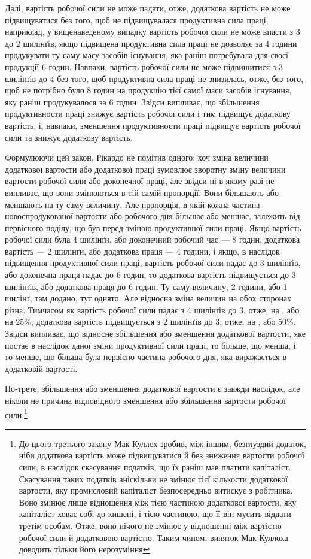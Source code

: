 Далі, вартість робочої сили не може падати, отже, додаткова
вартість не може підвищуватися без того, щоб не підвищувалася
продуктивна сила праці; наприклад, у вищенаведеному випадку
вартість робочої сили не може впасти з 3 до 2 шилінґів, якщо
підвищена продуктивна сила праці не дозволяє за 4 години продукувати
ту саму масу засобів існування, яка раніш потребувала
для своєї продукції 6 годин. Навпаки, вартість робочої сили не
може підвищитися з 3 шилінґів до 4 без того, щоб продуктивна
сила праці не знизилась, отже, без того, щоб не потрібно було
8 годин на продукцію тієї самої маси засобів існування, яку раніш
продукувалося за 6 годин. Звідси випливає, що збільшення продуктивности
праці знижує вартість робочої сили і тим підвищує
додаткову вартість, і, навпаки, зменшення продуктивности праці
підвищує вартість робочої сили та знижує додаткову вартість.

Формулюючи цей закон, Рікардо не помітив одного: хоч зміна
величини додаткової вартости або додаткової праці зумовлює
зворотну зміну величини вартости робочої сили або доконечної
праці, але звідси ні в якому разі не випливає, що вони змінюються
в тій самій пропорції. Вони більшають або меншають на ту саму
величину. Але пропорція, в якій кожна частина новоспродукованої
вартости або робочого дня більшає або меншає, залежить
від первісного поділу, що був перед зміною продуктивної сили
праці. Якщо вартість робочої сили була 4 шилінґи, або доконечний
робочий час — 8 годин, додаткова вартість — 2 шилінґи,
або додаткова праця — 4 години, і якщо, в наслідок підвищення
продуктивної сили праці, вартість робочої сили падає
до 3 шилінґів, або доконечна праця падає до 6 годин, то додаткова
вартість підвищується до 3 шилінґів, або додаткова праця
до 6 годин. Ту саму величину, 2 години, або 1 шилінґ, там додано,
тут однято. Але відносна зміна величин на обох сторонах
різна. Тимчасом як вартість робочої сили падає з 4 шилінґів
до 3, отже, на , або на 25\%, додаткова вартість підвищується
з 2 шилінґів до 3, отже, на , або 50\%. Звідси випливає, що
відносне збільшення або зменшення додаткової вартости, яке
постає в наслідок даної зміни продуктивної сили праці, то більше,
що менша, і то менше, що більша була первісно частина робочого
дня, яка виражається в додатковій вартості.

По-третє, збільшення або зменшення додаткової вартости є
завжди наслідок, але ніколи не причина відповідного зменшення
або збільшення вартости робочої сили.\footnote{
До цього третього закону Мак Куллох зробив, між іншим, безглуздий
додаток, ніби додаткова вартість може підвищуватися й без зниження
вартости робочої сили, в наслідок скасування податків, що їх раніш мав
платити капіталіст. Скасування таких податків аніскільки не змінює
тієї кількости додаткової вартости, яку промисловий капіталіст безпосередньо
витискує з робітника. Воно змінює лише відношення між тією
частиною додаткової вартости, яку капіталіст ховає собі до кишені, і
тією частиною, що її він мусить віддати третім особам. Отже, воно нічого не
змінює у відношенні між вартістю робочої сили й додатковою вартістю.
Таким чином, виняток Мак Куллоха доводить тільки його нерозуміння
}

